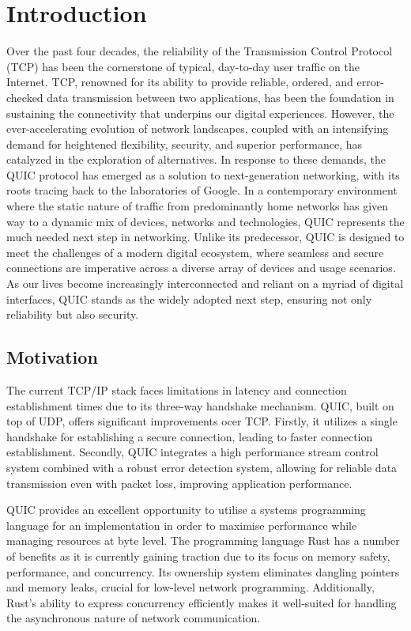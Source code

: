 \chapter{Introduction}

Over the past four decades, the reliability of the Transmission Control Protocol (TCP) has been the cornerstone
of typical, day-to-day user traffic on the Internet. TCP, renowned for its ability to provide reliable, ordered,
and error-checked data transmission between two applications, has been the foundation in sustaining the
connectivity that underpins our digital experiences. However, the ever-accelerating evolution of network
landscapes, coupled with an intensifying demand for heightened flexibility, security, and superior performance,
has catalyzed in the exploration of alternatives. In response to these demands, the QUIC protocol has emerged
as a solution to next-generation networking, with its roots tracing back to the laboratories of Google.
In a contemporary environment where the static nature of traffic from predominantly home networks has given way
to a dynamic mix of devices, networks and technologies, QUIC represents the much needed next step in networking.
Unlike its predecessor, QUIC is designed to meet the challenges of a modern digital ecosystem, where seamless
and secure connections are imperative across a diverse array of devices and usage scenarios. As our lives become
increasingly interconnected and reliant on a myriad of digital interfaces, QUIC stands as the widely adopted next
step, ensuring not only reliability but also security.

\section{Motivation}

The current TCP/IP stack faces limitations in latency and connection establishment times due to its three-way
handshake mechanism. QUIC, built on top of UDP, offers significant improvements ocer TCP. Firstly, it utilizes a single
handshake for establishing a secure connection, leading to faster connection establishment. Secondly,
QUIC integrates a high performance stream control system combined with a robust error detection system, allowing
for reliable data transmission even with packet loss, improving application performance.

QUIC provides an excellent opportunity to utilise a systems programming language for an implementation in order to
maximise performance while managing resources at byte level. The programming language Rust has a number of benefits
as it is currently gaining traction due to its focus on memory safety, performance, and concurrency. Its ownership
system eliminates dangling pointers and memory leaks, crucial for low-level network programming. Additionally,
Rust's ability to express concurrency efficiently makes it well-suited for handling the asynchronous nature of
network communication.

